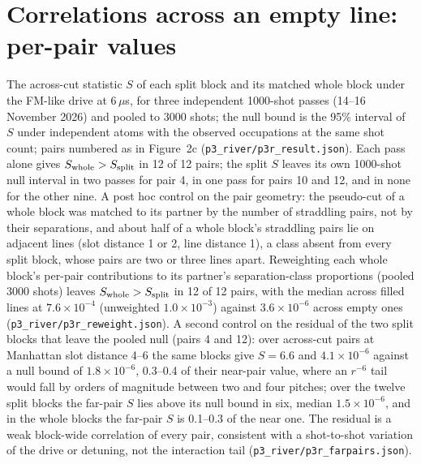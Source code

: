 \documentclass[11pt,a4paper]{article}
\begin{document}
\section{Correlations across an empty line: per-pair values}
\label{sec:si_p3}
The across-cut statistic $S$ of each split block and its matched whole block under the FM-like drive at 6\,$\mu$s, for three independent 1000-shot passes (14--16 November 2026) and pooled to 3000 shots; the null bound is the 95\% interval of $S$ under independent atoms with the observed occupations at the same shot count; pairs numbered as in Figure~2c (\texttt{p3\_river/p3r\_result.json}). Each pass alone gives $S_{\rm whole}>S_{\rm split}$ in 12 of 12 pairs; the split $S$ leaves its own 1000-shot null interval in two passes for pair 4, in one pass for pairs 10 and 12, and in none for the other nine. A post hoc control on the pair geometry: the pseudo-cut of a whole block was matched to its partner by the number of straddling pairs, not by their separations, and about half of a whole block's straddling pairs lie on adjacent lines (slot distance 1 or 2, line distance 1), a class absent from every split block, whose pairs are two or three lines apart. Reweighting each whole block's per-pair contributions to its partner's separation-class proportions (pooled 3000 shots) leaves $S_{\rm whole}>S_{\rm split}$ in 12 of 12 pairs, with the median across filled lines at $7.6\times10^{-4}$ (unweighted $1.0\times10^{-3}$) against $3.6\times10^{-6}$ across empty ones (\texttt{p3\_river/p3r\_reweight.json}). A second control on the residual of the two split blocks that leave the pooled null (pairs 4 and 12): over across-cut pairs at Manhattan slot distance 4--6 the same blocks give $S=6.6$ and $4.1\times10^{-6}$ against a null bound of $1.8\times10^{-6}$, 0.3--0.4 of their near-pair value, where an $r^{-6}$ tail would fall by orders of magnitude between two and four pitches; over the twelve split blocks the far-pair $S$ lies above its null bound in six, median $1.5\times10^{-6}$, and in the whole blocks the far-pair $S$ is 0.1--0.3 of the near one. The residual is a weak block-wide correlation of every pair, consistent with a shot-to-shot variation of the drive or detuning, not the interaction tail (\texttt{p3\_river/p3r\_farpairs.json}).
\end{document}

